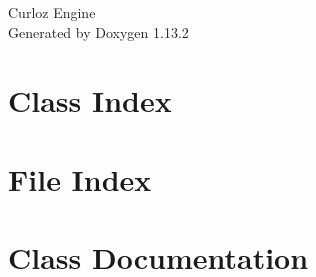 \documentclass[twoside]{book}
\newcommand{\+}{\discretionary{\mbox{\scriptsize$\hookleftarrow$}}{}{}}
\newcommand{\clearemptydoublepage}{%
    \newpage{\pagestyle{empty}\cleardoublepage}%
  }
\begin{document}
  \raggedbottom
    \hypersetup{pageanchor=false,
                bookmarksnumbered=true,
                pdfencoding=unicode
               }
  \begin{titlepage}
  \vspace*{7cm}
  \begin{center}%
  {\Large Curloz Engine}\\
  \vspace*{1cm}
  {\large Generated by Doxygen 1.13.2}\\
  \end{center}
  \end{titlepage}
  \clearemptydoublepage
  \tableofcontents
  \clearemptydoublepage
  \hypersetup{pageanchor=true}
\chapter{Class Index}

\chapter{File Index}

\chapter{Class Documentation}














\end{document}
